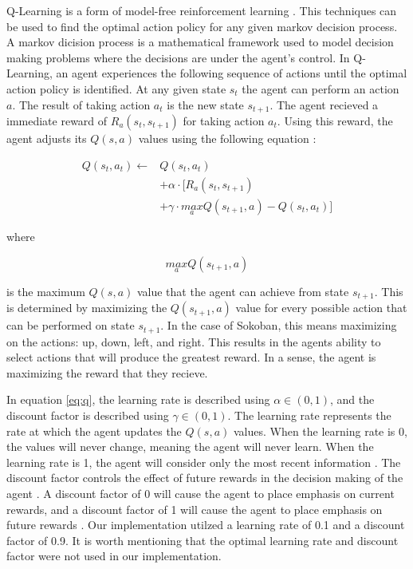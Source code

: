 \documentclass[times, 10pt,twocolumn]{article}
\begin{document}

Q-Learning is a form of model-free reinforcement learning \cite{Watkins1992}. This techniques can be used to find the optimal action policy for any given markov decision process. A markov dicision process is a mathematical framework used to model decision making problems where the decisions are under the agent's control. In Q-Learning, an agent experiences the following sequence of actions until the optimal action policy is identified. At any given state $s_t$ the agent can perform an action $a$. The result of taking action $a_t$ is the new state $s_{t+1}$. The agent recieved a immediate reward of $R_a(s_t, s_{t+1})$ for taking action $a_t$. Using this reward, the agent adjusts its $Q(s, a)$ values using the following equation \cite{Watkins1992}:

\begin{equation}
\label{eq:q}
\begin{split}
Q(s_t, a_t) \gets &Q(s_t, a_t) \\
                  &+ \alpha \cdot [R_a(s_t, s_{t+1}) \\
                  &+ \gamma \cdot \underset{a}{max}Q(s_{t+1}, a) - Q(s_t, a_t)]
\end{split}
\end{equation}

where 

\begin{equation}
\underset{a}{max}Q(s_{t+1}, a)
\end{equation}

is the maximum $Q(s, a)$ value that the agent can achieve from state $s_{t+1}$. This is determined by maximizing the $Q(s_{t+1}, a)$ value for every possible action that can be performed on state $s_{t+1}$. In the case of Sokoban, this means maximizing on the actions: up, down, left, and right. This results in the agents ability to select actions that will produce the greatest reward. In a sense, the agent is maximizing the reward that they recieve. 

In equation \ref{eq:q}, the learning rate is described using $\alpha \in (0, 1)$, and the discount factor is described using $\gamma \in (0, 1)$. The learning rate represents the rate at which the agent updates the $Q(s, a)$ values. When the learning rate is 0, the values will never change, meaning the agent will never learn. When the learning rate is 1, the agent will consider only the most recent information \cite{Littman94markovgames}. The discount factor controls the effect of future rewards in the decision making of the agent \cite{Littman94markovgames}. A discount factor of 0 will cause the agent to place emphasis on current rewards, and a discount factor of 1 will cause the agent to place emphasis on future rewards \cite{Littman94markovgames}. Our implementation utilzed a learning rate of 0.1 and a discount factor of 0.9. It is worth mentioning that the optimal learning rate and discount factor were not used in our implementation.
\end{document}
